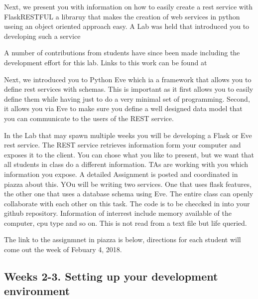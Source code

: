Next, we present you with information on how to easily create a rest
service with FlaskRESTFUL a libraruy that makes the creation of web
services in python useing an object oriented approach easy. A Lab was
held that introduced you to developing such a service


A number of contributions from students have since been made including
the development effort for this lab. Links to this work can be found
at


Next, we introduced you to Python Eve which ia a framework that allows
you to define rest services with schemas. This is important as it
first allows you to easily define them while having just to do a very
minimal set of programming. Second, it allows you via Eve to make sure
you define a well designed data model that you can communicate to the
users of the REST service.


In the Lab that may spawn multiple weeks you will be developing a
Flask or Eve rest service.  The REST service retrieves information
form your computer and exposes it to the client. You can chose what
you like to present, but we want that all students in class do a
different information. TAs are working with you which information you
expose. A detailed Assignment is posted and coordinated in piazza
about this. YOu will be writing two services. One that uses flask
features, the other one that uses a database schema using Eve. The
entire class can openly collaborate with each other on this task. The
code is to be checcked in into your github repository. Information of
interrest include memory available of the computer, cpu type and so
on. This is not read from a text file but life queried.


The link to the assignmnet in piazza is below, directions for each student will come out the week of Febuary 4, 2018. 


\subsection{Weeks 2-3. Setting up your development environment}

